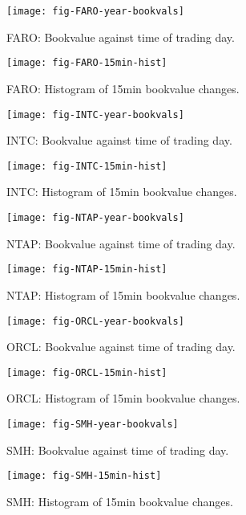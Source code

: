 \documentclass[12pt]{article}
\begin{document}
\begin{figure}
  \texttt{[image: fig-FARO-year-bookvals]}
  \caption{FARO: Bookvalue against time of trading day.}
\end{figure}

\begin{figure}
  \texttt{[image: fig-FARO-15min-hist]} \\
  \caption{FARO: Histogram of 15min bookvalue changes.}
\end{figure}

\begin{figure}
  \texttt{[image: fig-INTC-year-bookvals]}
  \caption{INTC: Bookvalue against time of trading day.}
\end{figure}

\begin{figure}
  \texttt{[image: fig-INTC-15min-hist]} \\
  \caption{INTC: Histogram of 15min bookvalue changes.}
\end{figure}

\begin{figure}
  \texttt{[image: fig-NTAP-year-bookvals]}
  \caption{NTAP: Bookvalue against time of trading day.}
\end{figure}

\begin{figure}
  \texttt{[image: fig-NTAP-15min-hist]} \\
  \caption{NTAP: Histogram of 15min bookvalue changes.}
\end{figure}

\begin{figure}
  \texttt{[image: fig-ORCL-year-bookvals]}
  \caption{ORCL: Bookvalue against time of trading day.}
\end{figure}

\begin{figure}
  \texttt{[image: fig-ORCL-15min-hist]} \\
  \caption{ORCL: Histogram of 15min bookvalue changes.}
\end{figure}

\begin{figure}
  \texttt{[image: fig-SMH-year-bookvals]}
  \caption{SMH: Bookvalue against time of trading day.}
\end{figure}

\begin{figure}
  \texttt{[image: fig-SMH-15min-hist]} \\
  \caption{SMH: Histogram of 15min bookvalue changes.}
\end{figure}
\end{document}
